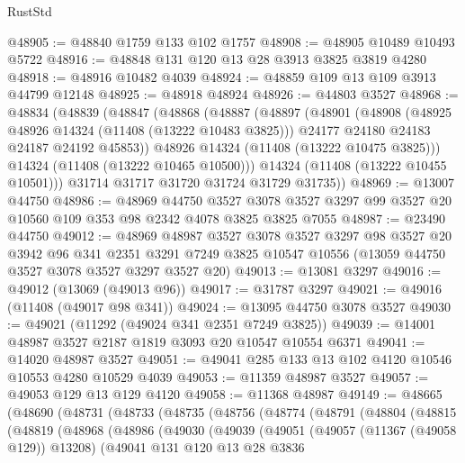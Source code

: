 \begin{lexlean}{RustStd}
\begin{coremodule}
@48905 := @48840 @1759 @133 @102 @1757
@48908 := @48905 @10489 @10493 @5722
@48916 := @48848 @131 @120 @13 @28 @3913 @3825 @3819 @4280
@48918 := @48916 @10482 @4039
@48924 := @48859 @109 @13 @109 @3913 @44799 @12148
@48925 := @48918 @48924
@48926 := @44803 @3527
@48968 := @48834
    (@48839
      (@48847
        (@48868
          (@48887
            (@48897
              (@48901
                (@48908
                  (@48925 @48926 @14324 (@11408 (@13222 @10483 @3825)))
                  @24177
                  @24180
                  @24183
                  @24187
                  @24192
                  @45853))
              @48926
              @14324
              (@11408 (@13222 @10475 @3825)))
            @14324
            (@11408 (@13222 @10465 @10500)))
          @14324
          (@11408 (@13222 @10455 @10501)))
        @31714
        @31717
        @31720
        @31724
        @31729
        @31735))
@48969 := @13007 @44750
@48986 := @48969
    @44750
    @3527
    @3078
    @3527
    @3297
    @99
    @3527
    @20
    @10560
    @109
    @353
    @98
    @2342
    @4078
    @3825
    @3825
    @7055
@48987 := @23490 @44750
@49012 := @48969
    @48987
    @3527
    @3078
    @3527
    @3297
    @98
    @3527
    @20
    @3942
    @96
    @341
    @2351
    @3291
    @7249
    @3825
    @10547
    @10556
    (@13059 @44750 @3527 @3078 @3527 @3297 @3527 @20)
@49013 := @13081 @3297
@49016 := @49012 (@13069 (@49013 @96))
@49017 := @31787 @3297
@49021 := @49016 (@11408 (@49017 @98 @341))
@49024 := @13095 @44750 @3078 @3527
@49030 := @49021 (@11292 (@49024 @341 @2351 @7249 @3825))
@49039 := @14001 @48987 @3527 @2187 @1819 @3093 @20 @10547 @10554 @6371
@49041 := @14020 @48987 @3527
@49051 := @49041 @285 @133 @13 @102 @4120 @10546 @10553 @4280 @10529 @4039
@49053 := @11359 @48987 @3527
@49057 := @49053 @129 @13 @129 @4120
@49058 := @11368 @48987
@49149 := @48665
    (@48690
      (@48731
        (@48733
          (@48735
            (@48756
              (@48774
                (@48791
                  (@48804
                    (@48815
                      (@48819
                        (@48968
                          (@48986
                            (@49030
                              (@49039
                                (@49051
                                  (@49057 (@11367 (@49058 @129)) @13208)
                                  (@49041
                                    @131
                                    @120
                                    @13
                                    @28
                                    @3836

\end{coremodule}
\end{lexlean}

